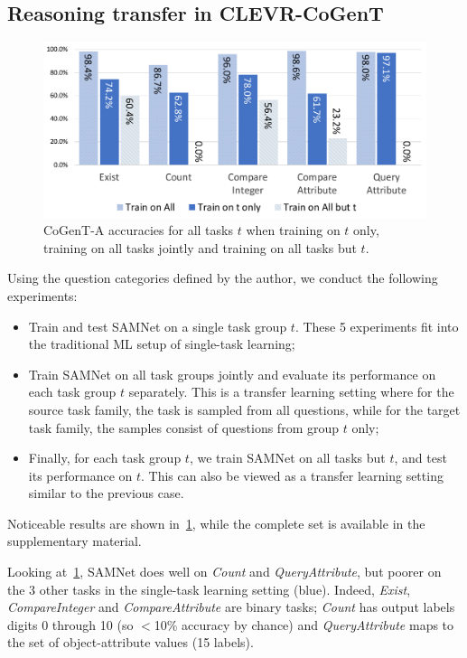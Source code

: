 \subsection{Reasoning transfer in CLEVR-CoGenT}
\label{sec:reasoning-clevr}

\begin{figure}[htbp]
	\centering
	\includegraphics[width=\columnwidth]{../img/plots/cogent_reasoning_transfer.pdf}
	\caption{CoGenT-A accuracies for all tasks $t$ when training on $t$ only, training on all tasks jointly and training on all tasks but $t$.}
	\label{fig:CoGenT-results}
\end{figure}

Using the question categories defined by the author, we conduct the following experiments:
\begin{itemize}
	\compresslist
	\item Train and test SAMNet on a single task group $t$. These 5 experiments fit into the traditional ML setup of single-task learning;
	\item Train SAMNet on all task groups jointly and evaluate its performance on each task group $t$ separately.
	This is a transfer learning setting where for the source task family, the task is sampled from all questions, while for the target task family, the samples consist of questions from group $t$ only;
	\item Finally, for each task group $t$, we train SAMNet on all tasks but $t$, and test its performance on $t$. This can also be viewed as a transfer learning setting similar to the previous case.
\end{itemize}

Noticeable results are shown in~\cref{fig:CoGenT-results}, while the complete set is available in the supplementary material.

Looking at~\cref{fig:CoGenT-results}, SAMNet does well on \textit{Count} and \textit{QueryAttribute}, but poorer on the 3 other tasks in the single-task learning setting (blue). Indeed, \textit{Exist}, \textit{CompareInteger} and \textit{CompareAttribute} are binary tasks; \textit{Count} has output labels digits 0 through 10 (so $<$10\% accuracy by chance) and \textit{QueryAttribute} maps to the set of object-attribute values (15 labels).

